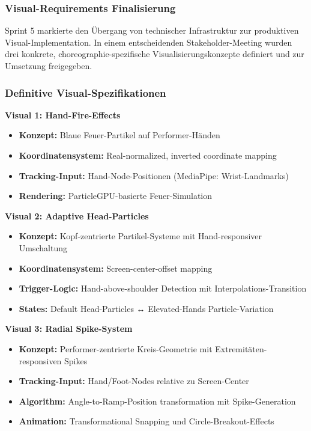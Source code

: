 \subsubsection{Visual-Requirements Finalisierung}

Sprint 5 markierte den Übergang von technischer Infrastruktur zur produktiven Visual-Implementation. In einem entscheidenden Stakeholder-Meeting wurden drei konkrete, choreographie-spezifische Visualisierungskonzepte definiert und zur Umsetzung freigegeben.

\subsubsection{Definitive Visual-Spezifikationen}

\textbf{Visual 1: Hand-Fire-Effects}
\begin{itemize}
    \item \textbf{Konzept:} Blaue Feuer-Partikel auf Performer-Händen
    \item \textbf{Koordinatensystem:} Real-normalized, inverted coordinate mapping
    \item \textbf{Tracking-Input:} Hand-Node-Positionen (MediaPipe: Wrist-Landmarks)
    \item \textbf{Rendering:} ParticleGPU-basierte Feuer-Simulation
\end{itemize}

\textbf{Visual 2: Adaptive Head-Particles}
\begin{itemize}
    \item \textbf{Konzept:} Kopf-zentrierte Partikel-Systeme mit Hand-responsiver Umschaltung
    \item \textbf{Koordinatensystem:} Screen-center-offset mapping
    \item \textbf{Trigger-Logic:} Hand-above-shoulder Detection mit Interpolations-Transition
    \item \textbf{States:} Default Head-Particles ↔ Elevated-Hands Particle-Variation
\end{itemize}

\textbf{Visual 3: Radial Spike-System}
\begin{itemize}
    \item \textbf{Konzept:} Performer-zentrierte Kreis-Geometrie mit Extremitäten-responsiven Spikes
    \item \textbf{Tracking-Input:} Hand/Foot-Nodes relative zu Screen-Center
    \item \textbf{Algorithm:} Angle-to-Ramp-Position transformation mit Spike-Generation
    \item \textbf{Animation:} Transformational Snapping und Circle-Breakout-Effects
\end{itemize}

